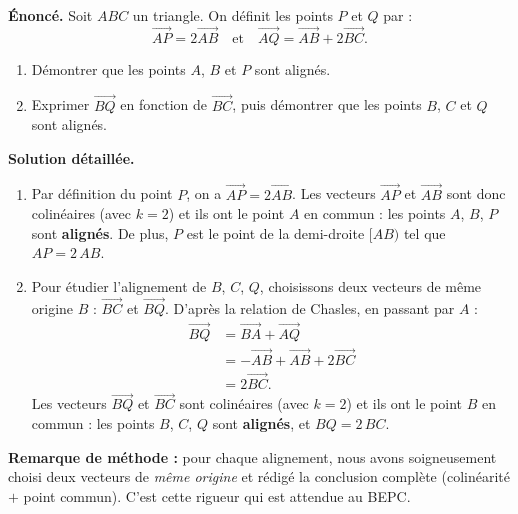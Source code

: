 \documentclass[11pt]{article}
\begin{document}
\begin{exoresolu}
\textbf{Énoncé.} Soit $ABC$ un triangle. On définit les points $P$ et $Q$ par :
\[ \overrightarrow{AP} = 2\overrightarrow{AB} \quad \text{et} \quad \overrightarrow{AQ} = \overrightarrow{AB} + 2\overrightarrow{BC}. \]
\begin{enumerate}
\item Démontrer que les points $A$, $B$ et $P$ sont alignés.
\item Exprimer $\overrightarrow{BQ}$ en fonction de $\overrightarrow{BC}$, puis démontrer que les points $B$, $C$ et $Q$ sont alignés.
\end{enumerate}
\tcblower
\textbf{Solution détaillée.}
\begin{enumerate}
\item Par définition du point $P$, on a $\overrightarrow{AP} = 2\overrightarrow{AB}$. Les vecteurs $\overrightarrow{AP}$ et $\overrightarrow{AB}$ sont donc colinéaires (avec $k = 2$) et ils ont le point $A$ en commun : les points $A$, $B$, $P$ sont \textbf{alignés}. De plus, $P$ est le point de la demi-droite $[AB)$ tel que $AP = 2\,AB$.
\item Pour étudier l'alignement de $B$, $C$, $Q$, choisissons deux vecteurs de même origine $B$ : $\overrightarrow{BC}$ et $\overrightarrow{BQ}$. D'après la relation de Chasles, en passant par $A$ :
\begin{align*}
\overrightarrow{BQ} &= \overrightarrow{BA} + \overrightarrow{AQ} \\
&= -\overrightarrow{AB} + \overrightarrow{AB} + 2\overrightarrow{BC} \\
&= 2\overrightarrow{BC}.
\end{align*}
Les vecteurs $\overrightarrow{BQ}$ et $\overrightarrow{BC}$ sont colinéaires (avec $k = 2$) et ils ont le point $B$ en commun : les points $B$, $C$, $Q$ sont \textbf{alignés}, et $BQ = 2\,BC$.
\end{enumerate}
\textbf{Remarque de méthode :} pour chaque alignement, nous avons soigneusement choisi deux vecteurs de \emph{même origine} et rédigé la conclusion complète (colinéarité $+$ point commun). C'est cette rigueur qui est attendue au BEPC.
\end{exoresolu}
\end{document}
